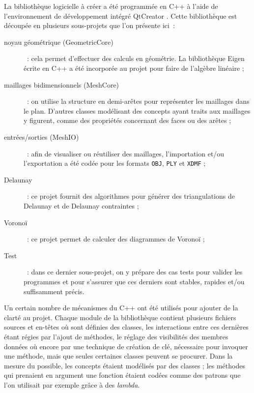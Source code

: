 \documentclass[12pt,a4paper]{report}
\begin{document}
\vspace{1cm}

La bibliothèque logicielle à créer a été programmée en C++ à l'aide de l'environnement de développement intégré QtCreator \cite{QtCreator}. Cette bibliothèque est découpée en plusieurs sous-projets que l'on présente ici~:
\begin{description}
\item[noyau géométrique (GeometricCore)]~: cela permet d'effectuer des calculs en géométrie. La bibliothèque Eigen \cite{Eigen} écrite en C++ a été incorporée au projet pour faire de l'algèbre linéaire ;
\item[maillages bidimensionnels (MeshCore)]~: on utilise la structure en demi-arêtes pour représenter les maillages dans le plan. D'autres classes modélisant des concepts ayant traits aux maillages y figurent, comme des propriétés concernant des faces ou des arêtes ;
\item[entrées/sorties (MeshIO)]~: afin de visualiser ou réutiliser des maillages, l'importation et/ou l'exportation a été codée pour les formats \verb+OBJ+, \verb+PLY+ et \verb+XDMF+\footnotemark {} ;
\item[Delaunay]~: ce projet fournit des algorithmes pour générer des triangulations de Delaunay et de Delaunay contraintes ;
\item[Voronoï]~: ce projet permet de calculer des diagrammes de Voronoï ;
\item[Test]~: dans ce dernier sous-projet, on y prépare des cas tests pour valider les programmes et pour s'assurer que ces derniers sont stables, rapides et/ou suffisamment précis.
\end{description}



Un certain nombre de mécanismes du C++ ont été utilisés pour ajouter de la clarté au projet. Chaque module de la bibliothèque contient plusieurs fichiers sources et en-têtes où sont définies des classes, les interactions entre ces dernières étant régies par l'ajout de méthodes, le réglage des visibilités des membres données où encore par une technique de création de clé, nécessaire pour invoquer une méthode, mais que seules certaines classes peuvent se procurer. Dans la mesure du possible, les concepts étaient modélisés par des classes ; les méthodes qui prenaient en argument une fonction étaient codées comme des patrons que l'on utilisait par exemple grâce à des \emph{lambda}.
\end{document}
